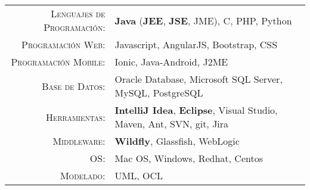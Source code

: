 \renewcommand{\arraystretch}{1.1}

	\begin{tabular}{>{}r>{}p{13cm}}
		\textsc{Lenguajes de Programación:}  		&   \textbf{Java} (\textbf{JEE}, \textbf{JSE}, JME), C, PHP, Python\\
		\textsc{Programación Web:}               	&   Javascript, AngularJS, Bootstrap, CSS\\
		\textsc{Programación Mobile:}               	&   Ionic, Java-Android, J2ME\\
		\textsc{Base de Datos:}                  &   Oracle Database, Microsoft SQL Server, MySQL, PostgreSQL \\
		\textsc{Herramientas:}	  		&   \textbf {IntelliJ Idea}, \textbf {Eclipse}, Visual Studio, Maven, Ant, SVN, git, Jira\\
		\textsc{Middleware:}				        &   \textbf{Wildfly}, Glassfish, WebLogic\\
		\textsc{OS:}	        &   Mac OS, Windows, Redhat, Centos\\
		\textsc{Modelado:}				        &   UML, OCL\\
	\end{tabular}
